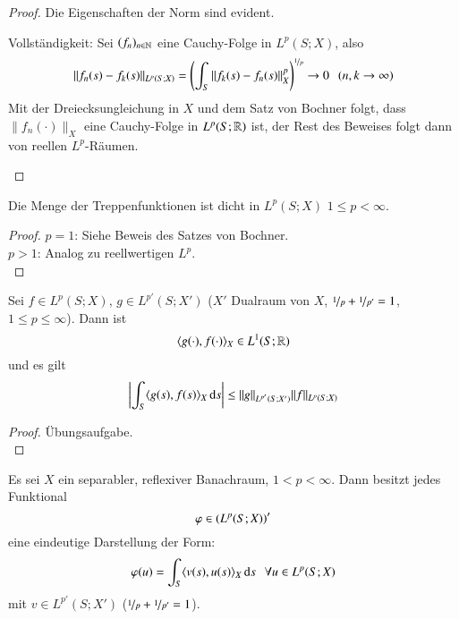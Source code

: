 \begin{proof}
    Die Eigenschaften der Norm sind evident.
    \begin{description}
    \item{Vollständigkeit:} Sei $(f_n)_{n\in\mathbb{N}}$ eine Cauchy-Folge in $L^p(S;X)$, also
    \[
        \|f_n(s)-f_k(s)\|_{L^p(S;X)} = \left( \int_S \|f_k(s)-f_n(s)\|_X^p\right)^{\nicefrac1p} \rightarrow 0
        \hspace{.25cm} (n,k\rightarrow \infty)
    \]
    Mit der Dreiecksungleichung in $X$ und dem Satz von Bochner folgt, dass $\|f_n(\cdot)\|_X$ eine
    Cauchy-Folge in $L^p(S;\mathbb{R})$ ist, der Rest des Beweises folgt dann von reellen $L^p$-Räumen.
    \end{description}
    \[ \]
\end{proof}

\begin{lem}\label{4.30}
    Die Menge der Treppenfunktionen ist dicht in $L^p(S;X)$ $1\leq p <\infty$.
\end{lem}

\begin{proof}
    $p=1$: Siehe Beweis des Satzes von Bochner.\\
    $p>1$: Analog zu reellwertigen $L^p$. \[ \]
\end{proof}

\begin{theorem}\label{4.31}
    Sei $f\in L^p(S;X)$, $g\in L^{p'}(S;X')$ ($X'$ Dualraum von $X$, $\nicefrac1p+\nicefrac1{p'}=1$, 
    $1\leq p \leq \infty$). Dann ist
    \[
        \langle g(\cdot), f(\cdot)\rangle _X\in L^1(S;\mathbb{R})
    \]
    und es gilt
    \[
        \left| \int_S\langle g(s),f(s)\rangle_X\, \mathrm{d} s \right| \leq \|g\|_{L^{p'}(S;X')}\|f\|_{L^p(S;X)}
    \]
\end{theorem}

\begin{proof}
    Übungsaufgabe. \[ \]
\end{proof}

\begin{theorem}[Darstellungssatz]\label{4.32}
    Es sei $X$ ein separabler, reflexiver Banachraum, $1<p<\infty$. Dann besitzt jedes Funktional
    \[
        \varphi \in \left( L^p(S;X)\right)'
    \]
    eine eindeutige Darstellung der Form:
    \[
        \varphi (u) = \int_S\langle v(s),u(s)\rangle_X \, \mathrm{d} s \hspace{.25cm} \forall u\in L^p(S;X)
    \]
    mit $v\in L^{p'}(S;X')$ ($\nicefrac1p+\nicefrac1{p'}=1$).
\end{theorem}

